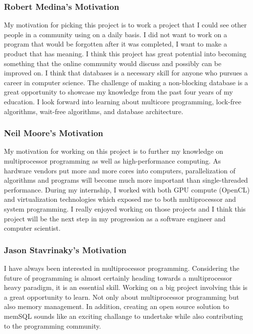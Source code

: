 \documentclass[letterpaper]{article}
\begin{document}
  \subsubsection{Robert Medina's Motivation}
  My motivation for picking this project is to work a project that I could see other people in a community using on a daily basis. I did not want to work on a program that would be 
  forgotten after it was completed, I want to make a product that has meaning. I think this project has great potential into becoming something that the online community would discuss 
  and possibly can be improved on. I think that databases is a necessary skill for anyone who pursues a career in computer science. The challenge of making a non-blocking database is 
  a great opportunity to showcase my knowledge from the past four years of my education. I look forward into learning about multicore programming, lock-free algorithms, wait-free algorithms,
  and database architecture.
  \subsubsection{Neil Moore's Motivation}
  My motivation for working on this project is to further my knowledge on multiprocessor programming as well as high-performance computing.  
  As hardware vendors put more and more cores into computers, parallelization of algorithms and programs will become much more important than
  single-threaded performance. During my internship, I worked with both GPU compute (OpenCL) and virtualization technologies which exposed me
  to both multiprocessor and system programming. I really enjoyed working on those projects and I think this project will be the next step 
  in my progression as a software engineer and computer scientist.
  \subsubsection{Jason Stavrinaky's Motivation}
  I have always been interested in multiprocessor programming. Considering the future of programming is almost certainly heading towards a
  multiprocessor heavy paradigm, it is an essential skill. Working on a big project involving this is a great opportunity to learn. Not only
  about multiprocessor programming but also memory management. In addition, creating an open source solution to memSQL sounds like an exciting
  challange to undertake while also contributing to the programming community.
  
\end{document}
